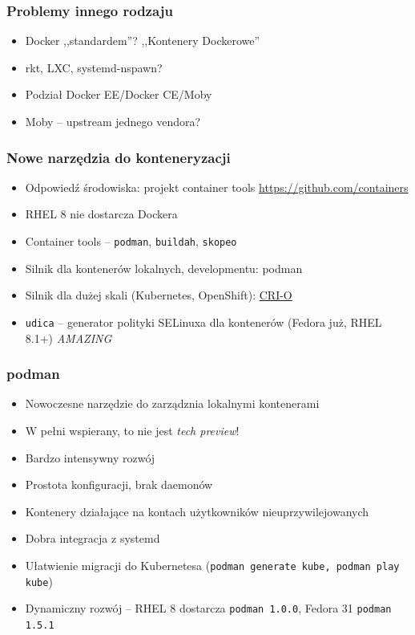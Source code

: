 \documentclass[dvipsnames,table]{beamer}
\begin{document}
\begin{frame}
	\frametitle{Problemy innego rodzaju}
	\begin{itemize}
		\item Docker ,,standardem''? ,,Kontenery Dockerowe''
		\item rkt, LXC, systemd-nspawn?
		\item Podział Docker EE/Docker CE/Moby
		\item Moby -- upstream jednego vendora?
	\end{itemize}
\end{frame}

\begin{frame}
	\frametitle{Nowe narzędzia do konteneryzacji}
\begin{itemize}
	\item Odpowiedź środowiska: projekt container tools \url{https://github.com/containers} 
	\item RHEL 8 nie dostarcza Dockera
	\item Container tools -- {\tt podman}, {\tt buildah}, {\tt skopeo}
	\item Silnik dla kontenerów lokalnych, developmentu: podman
	\item Silnik dla dużej skali (Kubernetes, OpenShift): \href{https://cri-o.io/}{CRI-O}
	\item {\tt udica} -- generator polityki SELinuxa dla kontenerów (Fedora już, RHEL 8.1+) {\it AMAZING}

\end{itemize}
\end{frame}


\begin{frame}
	\frametitle{podman}
	\begin{itemize}
		\item Nowoczesne narzędzie do zarządznia lokalnymi kontenerami
		\item W pełni wspierany, to nie jest {\em tech preview}!
		\item Bardzo intensywny rozwój
		\item Prostota konfiguracji, brak daemonów
		\item Kontenery działające na kontach użytkowników nieuprzywilejowanych
		\item Dobra integracja z systemd
		\item Ułatwienie migracji do Kubernetesa ({\tt podman generate kube, podman play kube})
		\item Dynamiczny rozwój -- RHEL 8 dostarcza {\tt podman 1.0.0}, Fedora 31 {\tt podman 1.5.1}
	\end{itemize}
\end{frame}
\end{document}

